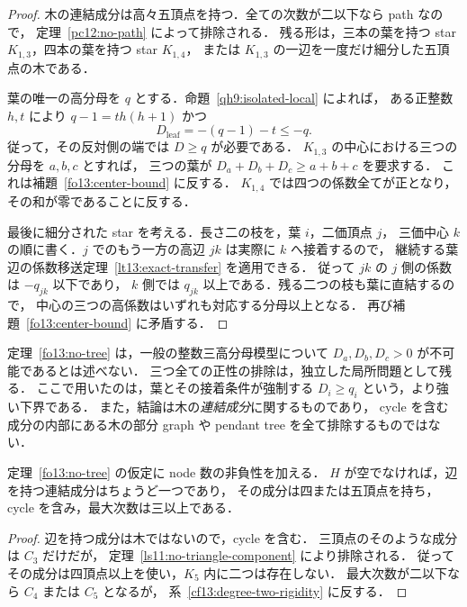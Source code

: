 \begin{proof}
木の連結成分は高々五頂点を持つ．全ての次数が二以下なら path なので，
定理~\ref{pc12:no-path} によって排除される．
残る形は，三本の葉を持つ star $K_{1,3}$，四本の葉を持つ star $K_{1,4}$，
または $K_{1,3}$ の一辺を一度だけ細分した五頂点の木である．

葉の唯一の高分母を $q$ とする．命題~\ref{qh9:isolated-local} によれば，
ある正整数 $h,t$ により $q-1=t h(h+1)$ かつ
\[
 D_{\mathrm{leaf}}=-(q-1)-t\leq-q.
\]
従って，その反対側の端では $D\geq q$ が必要である．
$K_{1,3}$ の中心における三つの分母を $a,b,c$ とすれば，
三つの葉が $D_a+D_b+D_c\geq a+b+c$ を要求する．
これは補題~\ref{fo13:center-bound} に反する．
$K_{1,4}$ では四つの係数全てが正となり，その和が零であることに反する．

最後に細分された star を考える．長さ二の枝を，葉 $i$，二価頂点 $j$，
三価中心 $k$ の順に書く．$j$ でのもう一方の高辺 $jk$ は実際に $k$ へ接着するので，
継続する葉辺の係数移送定理~\ref{lt13:exact-transfer} を適用できる．
従って $jk$ の $j$ 側の係数は $-q_{jk}$ 以下であり，
$k$ 側では $q_{jk}$ 以上である．残る二つの枝も葉に直結するので，
中心の三つの高係数はいずれも対応する分母以上となる．
再び補題~\ref{fo13:center-bound} に矛盾する．
\end{proof}

\begin{remark}[局所符号問題との区別]\label{fo13:scope}
定理~\ref{fo13:no-tree} は，一般の整数三高分母模型について
$D_a,D_b,D_c>0$ が不可能であるとは述べない．
三つ全ての正性の排除は，独立した局所問題として残る．
ここで用いたのは，葉とその接着条件が強制する
$D_i\geq q_i$ という，より強い下界である．
また，結論は木の\emph{連結成分}に関するものであり，
cycle を含む成分の内部にある木の部分 graph や pendant tree を全て排除するものではない．
\end{remark}

\begin{corollary}\label{fo13:remaining-support}
定理~\ref{fo13:no-tree} の仮定に node 数の非負性を加える．
$H$ が空でなければ，辺を持つ連結成分はちょうど一つであり，
その成分は四または五頂点を持ち，cycle を含み，最大次数は三以上である．
\end{corollary}

\begin{proof}
辺を持つ成分は木ではないので，cycle を含む．
三頂点のそのような成分は $C_3$ だけだが，
定理~\ref{ls11:no-triangle-component} により排除される．
従ってその成分は四頂点以上を使い，$K_5$ 内に二つは存在しない．
最大次数が二以下なら $C_4$ または $C_5$ となるが，
系~\ref{cf13:degree-two-rigidity} に反する．
\end{proof}
